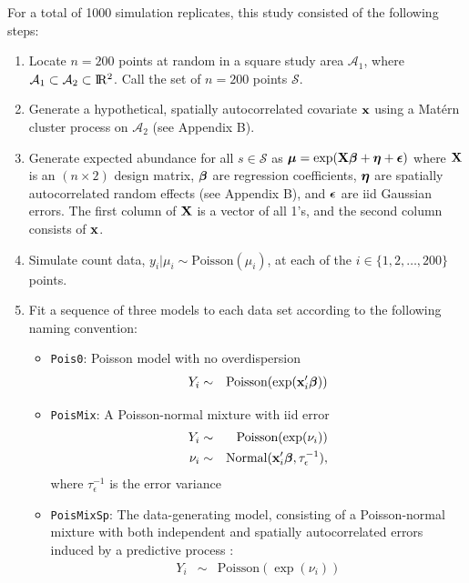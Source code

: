 \documentclass[12pt,english]{article}
\begin{document}
\begin{spacing}{1.9}
For a total of 1000 simulation replicates, this study consisted of the
following steps:
\begin{enumerate}
\item Locate $n=200$ points at random in a square study area
  $\mathcal{A}_1$, where
  $\mathcal{A}_1 \subset \mathcal{A}_2 \subset \R2$.  Call the
  set of $n=200$ points $\mathcal{S}$.
\item Generate a hypothetical, spatially autocorrelated covariate
  ${\bf x}$ using a Mat\'{e}rn cluster process on $\mathcal{A}_2$ (see
  Appendix B).
\item Generate expected abundance for all $s \in \mathcal{S}$ as
  $\boldsymbol{\mu} = \exp( {\bf X}\boldsymbol{\beta} + \boldsymbol{\eta} +\boldsymbol{\epsilon} )$ where
  ${\bf X}$ is an $(n \times 2)$ design matrix, $\boldsymbol{\beta}$ are regression coefficients, $\boldsymbol{\eta}$ are spatially autocorrelated random effects (see Appendix B), and
  $\boldsymbol{\epsilon}$ are iid Gaussian errors.  The first column of ${\bf X}$ is a vector of all 1's, and the second column
  consists of ${\bf x}$.
\item Simulate count data, $y_i|\mu_i \sim \textrm{Poisson}(\mu_i)$,
  at each of the $i \in \{ 1,2,\hdots,200 \}$ points.
\item Fit a sequence of three models to each data set according to the
  following naming convention:
  \begin{itemize}
  \item \texttt{Pois0}: Poisson model with no overdispersion
    \begin{eqnarray*}
      Y_i & \sim & \textrm{Poisson}(\exp({\bf x}_i^\prime \boldsymbol{\beta})) \\
    \end{eqnarray*}
  \item \texttt{PoisMix}: A Poisson-normal mixture with iid error
    \begin{eqnarray*}
      Y_i & \sim & \textrm{Poisson}(\exp(\nu_i)) \\
      \nu_i & \sim & \textrm{Normal}({\bf x}_i^\prime \boldsymbol{\beta}, \tau_\epsilon^{-1}),\\
    \end{eqnarray*}
    where $\tau_\epsilon^{-1}$ is the error variance
  \item \texttt{PoisMixSp}: The data-generating model, consisting of a
    Poisson-normal mixture with both independent and spatially autocorrelated
    errors induced by a predictive process
    \citep[cf.][]{BanerjeeEtAl2008}:
    \begin{eqnarray*}
      Y_i & \sim & \textrm{Poisson}(\exp(\nu_i)) \\

\end{eqnarray*}
\end{itemize}
\end{enumerate}
\end{spacing}
\end{document}
